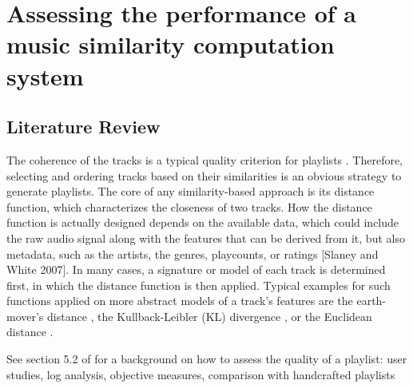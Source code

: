 \chapter{Assessing the performance of a music similarity computation system} 

\label{Chapter3} 


\section{Literature Review}

The coherence of the tracks is a typical quality criterion for playlists \cite{logan04}. 
Therefore, selecting and ordering tracks based on their similarities is an obvious strategy to generate playlists. The core of any similarity-based approach is its distance function, which characterizes the closeness of two tracks. How the distance function is actually designed depends on the available data, which could include the raw audio signal along with the features that can be derived from it, but also metadata, such as the artists, the genres, playcounts, or ratings [Slaney and White 2007]. In many cases, a signature or model of each track is determined first, in which the distance function is then applied. Typical examples for such functions applied on more abstract models of a track’s features are the earth-mover’s distance \cite{logan04}, the Kullback-Leibler (KL) divergence \cite{vignoli05}, or the Euclidean distance \cite{knees06}.

See section 5.2 of \cite{bonnin14} for a background on how to assess the quality of a playlist: user studies, log analysis, objective measures, comparison with handcrafted playlists

